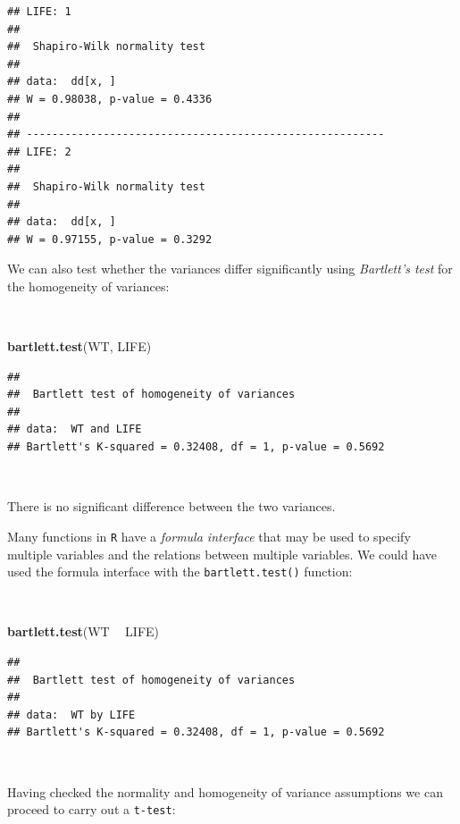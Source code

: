 \documentclass[12pt,a4paper]{book}
\newenvironment{Shaded}{\begin{snugshade}}{\end{snugshade}}
\newcommand{\KeywordTok}[1]{\textcolor[rgb]{0.13,0.29,0.53}{\textbf{#1}}}
\newcommand{\NormalTok}[1]{#1}
\newcommand{\OperatorTok}[1]{\textcolor[rgb]{0.81,0.36,0.00}{\textbf{#1}}}
\newcommand{\StringTok}[1]{\textcolor[rgb]{0.31,0.60,0.02}{#1}}
\theoremstyle{definition}
\theoremstyle{definition}
\theoremstyle{definition}
\theoremstyle{remark}
\begin{document}
\begin{verbatim}
## LIFE: 1
## 
##  Shapiro-Wilk normality test
## 
## data:  dd[x, ]
## W = 0.98038, p-value = 0.4336
## 
## -------------------------------------------------------- 
## LIFE: 2
## 
##  Shapiro-Wilk normality test
## 
## data:  dd[x, ]
## W = 0.97155, p-value = 0.3292
\end{verbatim}

\newpage

We can also test whether the variances differ significantly using
\emph{Bartlett's test} for the homogeneity of variances:

~

\begin{Shaded}
\begin{Highlighting}[]
\KeywordTok{bartlett.test}\NormalTok{(WT, LIFE)}
\end{Highlighting}
\end{Shaded}

\begin{verbatim}
## 
##  Bartlett test of homogeneity of variances
## 
## data:  WT and LIFE
## Bartlett's K-squared = 0.32408, df = 1, p-value = 0.5692
\end{verbatim}

~

There is no significant difference between the two variances.

Many functions in \texttt{R} have a \emph{formula interface} that may be
used to specify multiple variables and the relations between multiple
variables. We could have used the formula interface with the
\texttt{bartlett.test()} function:

~

\begin{Shaded}
\begin{Highlighting}[]
\KeywordTok{bartlett.test}\NormalTok{(WT }\OperatorTok{~}\StringTok{ }\NormalTok{LIFE)}
\end{Highlighting}
\end{Shaded}

\begin{verbatim}
## 
##  Bartlett test of homogeneity of variances
## 
## data:  WT by LIFE
## Bartlett's K-squared = 0.32408, df = 1, p-value = 0.5692
\end{verbatim}

~

Having checked the normality and homogeneity of variance assumptions we
can proceed to carry out a \texttt{t-test}:
\end{document}
